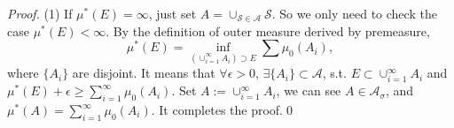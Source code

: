 \documentclass{article}
\newcommand{\cp}[1]{\cup_{#1=1}^{\infty}}
\begin{document}
\begin{proof}
    (1) If $\mu^{*}(E)=\infty$, 
    just set $A=\cup_{\mathcal{S}\in\mathcal{A}}\mathcal{S}$. 
    So we only need  to check the case $\mu^{*}(E)<\infty$.
    By the definition of outer measure derived by premeasure,
    \begin{displaymath}
        \mu^{*}(E)=\inf_{(\cp{i}A_{i})\supset E}\sum\mu_{0}(A_{i}),
    \end{displaymath} 
    where $\{A_{i}\}$ are disjoint. 
    It means that $\forall\epsilon>0$, 
    $\exists\{A_{i}\}\subset\mathcal{A}$, 
    s.t. $E\subset\cup_{i=1}^{\infty}A_{i}$ 
    and $\mu^{*}(E)+\epsilon\ge\sum_{i=1}^{\infty}\mu_{0}(A_{i})$.
    Set $A:=\cp{i}A_{i}$, we can see $A\in\mathcal{A}_{\sigma}$, 
    and $\mu^{*}(A)=\sum_{i=1}^{\infty}\mu_{0}(A_{i})$. 
    It completes the proof.\qed


\end{proof}
\end{document}
